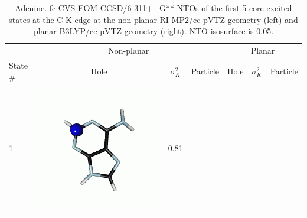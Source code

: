 \documentclass[journal=jctcce,manuscript=article]{achemso}
\begin{document}
\begin{table}[H]
\centering
\caption{Adenine. fc-CVS-EOM-CCSD/6-311++G** NTOs of the first 5 core-excited states at the C K-edge at the non-planar RI-MP2/cc-pVTZ geometry (left) and planar B3LYP/cc-pVTZ geometry (right). NTO isosurface is 0.05.\label{adenine-ntos-Cedge}}
\vspace{3em}
\small
\begin{tabular}{ l| c c c | c c c }
\hline
& \multicolumn{3}{c}{Non-planar} & \multicolumn{3}{|c}{Planar} \\
    State \# &  Hole &$\sigma_K^2$& Particle & Hole &$\sigma_K^2$& Particle \\
    \hline
    1 &  
    \begin{minipage}{0.2\textwidth}
        \centering
        \includegraphics[scale=0.10]{NTO/Adenine_C/1h_C1.png}
    \end{minipage}
    & 0.81
    &  \begin{minipage}{0.2\textwidth}
        \centering

\end{minipage}
\end{tabular}
\end{table}
\end{document}
